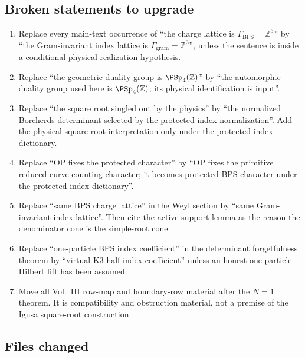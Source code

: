 \subsection{Broken statements to upgrade}

\begin{enumerate}
\item Replace every main-text occurrence of
``the charge lattice is \(\Gamma_{\mathrm{BPS}}=\mathbb Z^3\)''
by ``the Gram-invariant index lattice is
\(\Gamma_{\mathrm{gram}}=\mathbb Z^3\)'', unless the sentence is inside a
conditional physical-realization hypothesis.

\item Replace ``the geometric duality group is
\(\PSp_4(\mathbb Z)\)'' by ``the automorphic duality group used here is
\(\PSp_4(\mathbb Z)\); its physical identification is input''.

\item Replace ``the square root singled out by the physics'' by
``the normalized Borcherds determinant selected by the protected-index
normalization''.  Add the physical square-root interpretation only under
the protected-index dictionary.

\item Replace ``OP fixes the protected character'' by ``OP fixes the
primitive reduced curve-counting character; it becomes protected BPS
character under the protected-index dictionary''.

\item Replace ``same BPS charge lattice'' in the Weyl section by
``same Gram-invariant index lattice''.  Then cite the active-support
lemma as the reason the denominator cone is the simple-root cone.

\item Replace ``one-particle BPS index coefficient'' in the determinant
forgetfulness theorem by ``virtual K3 half-index coefficient'' unless an
honest one-particle Hilbert lift has been assumed.

\item Move all Vol.~III row-map and boundary-row material after the
\(N=1\) theorem.  It is compatibility and obstruction material, not a
premise of the Igusa square-root construction.
\end{enumerate}

\subsection{Files changed}


